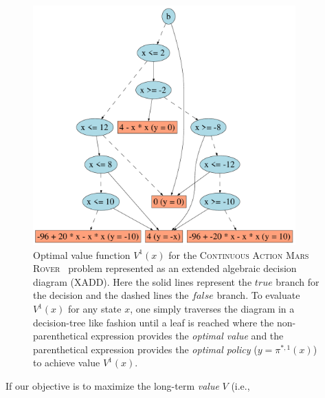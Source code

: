 \documentclass[twoside,11pt]{article}
\newcommand{\MarsRover}{\textsc{Mars Rover }}
\newcommand{\true}{\mathit{true}}
\newcommand{\false}{\mathit{false}}
\begin{document}
\begin{figure}[t!]
\begin{minipage}[b]{0.47\linewidth}
\end{minipage}
\begin{minipage}[b]{0.53\linewidth}
\includegraphics[width=0.9\textwidth]{Figures1/camdp/v2_mr_dd.pdf}
\vspace{2mm}

\caption{\footnotesize Optimal value function $V^1(x)$ for the
\textsc{Continuous Action}  \MarsRover\ problem represented as an extended algebraic decision
diagram (XADD).  Here the solid lines represent the $\true$ branch for
the decision and the dashed lines the $\false$ branch.  To evaluate
$V^1(x)$ for any state $x$, one simply traverses the diagram in a
decision-tree like fashion until a leaf is reached where the
non-parenthetical expression provides the \emph{optimal value} and the
parenthetical expression provides the \emph{optimal policy} 
($y = \pi^{*,1}(x)$) to achieve value $V^1(x)$.}
\label{fig:opt_val_pol}
\vspace{-5mm}
\end{minipage}
\vspace{-5mm}
\end{figure}
If our objective is to maximize the long-term \emph{value} $V$ (i.e.,
\end{document}
